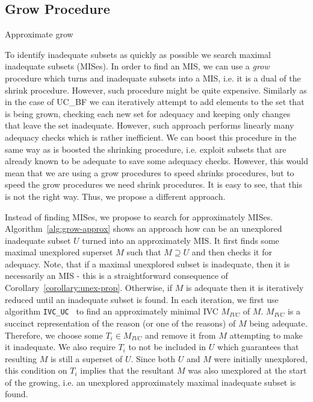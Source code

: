 \subsection{Grow Procedure}
 
\begin{algorithm}[!t]

\caption{Approximate grow}
\end{algorithm}

To identify inadequate subsets as quickly as possible we search  maximal inadequate subsets (MISes).  
In order to find an MIS, we can use a \emph{grow} procedure which turns and inadequate subsets into a MIS, i.e. it is a dual of the shrink procedure. However, such procedure might be quite expensive. Similarly as in the case of UC\_BF we can iteratively attempt to add elements to the set that is being
grown, checking each new set for adequacy and keeping only changes that
leave the set inadequate. However, such approach performs linearly many adequacy checks which is rather inefficient. We can boost this procedure in the same way as is boosted the shrinking procedure, i.e. exploit subsets that are already known to be adequate to save some adequacy checks. However, this would mean that we are using a grow procedures to speed shrinks procedures, but to speed the grow procedures we need shrink procedures. It is easy to see, that this is not the right way. Thus, we propose a different approach. 

Instead of finding MISes, we propose to search for approximately MISes. Algorithm~\ref{alg:grow-approx} shows an approach how can be an unexplored inadequate subset $U$ turned into an approximately MIS. It first finds some maximal unexplored superset $M$ such that $M \supseteq U$ and then checks it for adequacy. Note, that if a maximal unexplored subset is inadequate, then it is necessarily an MIS - this is a straightforward consequence of Corollary~\ref{corollary:unex-prop}. 
Otherwise, if $M$ is adequate then it is iteratively reduced until an inadequate subset is found. In each iteration, we first use algorithm \texttt{IVC\_UC}~\cite{single-ivc} to find an approximately minimal IVC $M_{IVC}$ of $M$. $M_{IVC}$ is a succinct representation of the reason (or one of the reasons) of $M$ being adequate. Therefore, we choose some $T_i \in M_{IVC}$ and remove it from $M$ attempting to make it inadequate. We also require $T_i$ to not be included in $U$ which guarantees that resulting $M$ is still a superset of $U$. 
Since both $U$ and $M$ were initially unexplored, this condition on $T_i$ implies that the resultant $M$ was also unexplored at the start of the growing, i.e. an unexplored approximately maximal inadequate subset is found. 

